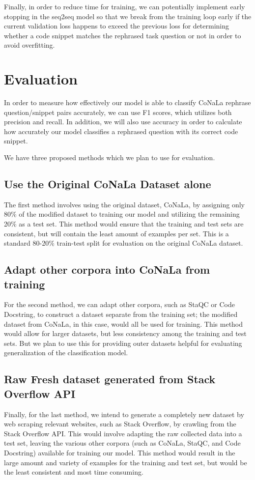\documentclass[11pt,a4paper]{article}
\begin{document}
Finally, in order to reduce time for training, we can potentially implement early stopping in the seq2seq model so that we break from the training loop early if the current validation loss happens to exceed the previous loss for determining whether a code snippet matches the rephrased task question or not in order to avoid overfitting.
\section{Evaluation}
In order to measure how effectively our model is able to classify CoNaLa rephrase question/snippet pairs accurately, we can use F1 scores, which utilizes both precision and recall. In addition, we will also use accuracy in order to calculate how accurately our model classifies a rephrased question with its correct code snippet. 

We have three proposed methods which we plan to use for evaluation. 
\subsection{Use the Original CoNaLa Dataset alone}
The first method involves using the original dataset, CoNaLa, by assigning only 80\% of the modified dataset to training our model and utilizing the remaining 20\% as a test set. This method would ensure that the training and test sets are consistent, but will contain the least amount of examples per set. This is a standard 80-20\% train-test split for evaluation on the original CoNaLa dataset.

\subsection{Adapt other corpora into CoNaLa from training}
For the second method, we can adapt other corpora, such as StaQC or Code Docstring, to construct a dataset separate from the training set; the modified dataset from CoNaLa, in this case, would all be used for training. This method would allow for larger datasets, but less consistency among the training and test sets. But we plan to use this for providing outer datasets helpful for evaluating generalization of the classification model.

\subsection{Raw Fresh dataset generated from Stack Overflow API}
Finally, for the last method, we intend to generate a completely new dataset by web scraping relevant websites, such as Stack Overflow, by crawling from the Stack Overflow API. This would involve adapting the raw collected data into a test set, leaving the various other corpora (such as CoNaLa, StaQC, and Code Docstring) available for training our model. This method would result in the large amount and variety of examples for the training and test set, but would be the least consistent and most time consuming.
\end{document}
